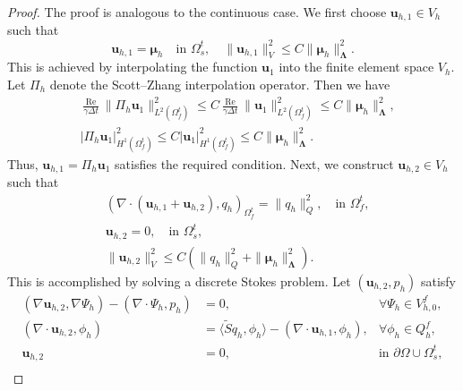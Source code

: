 \documentclass{article}
\newcommand{\bu}{{\mathbf{u}}}
\newcommand{\Reynolds}{{\operatorname{Re}}}
\begin{document}
\begin{proof}
    The proof is analogous to the continuous case. We first choose $\bu_{h,1} \in V_h$ such that 
    \begin{equation} 
        \bu_{h,1} = \boldsymbol{\mu}_h \quad \text{in } \Omega_s^t, \quad \|\bu_{h,1}\|_V^2 \leq C\|\boldsymbol{\mu}_h\|_{\boldsymbol{\Lambda}}^2.
    \end{equation}
    This is achieved by interpolating the function $\bu_1$ into the finite element space $V_h$. Let $\Pi_h$ denote the Scott--Zhang interpolation operator. Then we have
    \begin{equation}
        \begin{aligned}
            &\frac{\Reynolds}{\gamma \Delta t}\|\Pi_h\bu_1\|_{L^2(\Omega_f^t)}^2 \leq C  \frac{\Reynolds}{\gamma \Delta t}\|\bu_1\|_{L^2(\Omega_f^t)}^2\leq C \|\boldsymbol{\mu}_h\|_{\boldsymbol{\Lambda}}^2,\\
            &|\Pi_h\bu_1|_{H^1(\Omega_f^t)}^2 \leq C |\bu_1|_{H^1(\Omega_f^t)}^2 \leq C \|\boldsymbol{\mu}_h\|_{\boldsymbol{\Lambda}}^2.
        \end{aligned}
    \end{equation}
    Thus, $\bu_{h,1} = \Pi_h\bu_1$ satisfies the required condition. Next, we construct $\bu_{h,2}\in V_h$ such that
    \begin{equation}
        \begin{aligned}\label{cond:bu2_discretized}
            &(\nabla\cdot(\bu_{h,1}+\bu_{h,2}),q_h)_{\Omega_f^t} = \|q_h\|_Q^2, \quad \text{in } \Omega_f^t,\\
            &\bu_{h,2} = 0, \quad \text{in } \Omega_s^t,\\
            &\|\bu_{h,2}\|_V^2 \leq C(\|{q}_h\|_Q^2 + \|{\boldsymbol{\mu}}_h\|_{\boldsymbol{\Lambda}}^2).
        \end{aligned}
    \end{equation}
    This is accomplished by solving a discrete Stokes problem. Let $(\bu_{h,2},p_h)$ satisfy
    \begin{equation}\label{eq:stokes_aux4}
        \begin{aligned}
            (\nabla\bu_{h,2},\nabla\Psi_h) - (\nabla\cdot\Psi_h,p_h) &= 0, &\forall \Psi_h \in V_{h,0}^f,\\
            (\nabla\cdot\bu_{h,2},\phi_h) &= \langle \tilde{S}q_h, \phi_h\rangle - (\nabla\cdot \bu_{h,1}, \phi_h), &\forall \phi_h \in Q_h^f,\\
            \bu_{h,2} &= 0, &\text{in }\partial\Omega\cup \Omega_s^t,\\

\end{aligned}
\end{equation}
\end{proof}
\end{document}
